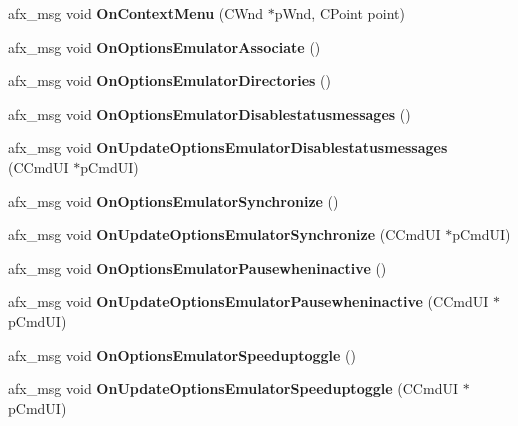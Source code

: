 \begin{DoxyCompactItemize}
afx\+\_\+msg void {\bfseries On\+Context\+Menu} (C\+Wnd $\ast$p\+Wnd, C\+Point point)
\item 
\mbox{\label{class_main_wnd_a824b678e28dacab4a43b4ac0918e8555}} 
afx\+\_\+msg void {\bfseries On\+Options\+Emulator\+Associate} ()
\item 
\mbox{\label{class_main_wnd_a5d36b0308cca73a7aa4af8df269a743c}} 
afx\+\_\+msg void {\bfseries On\+Options\+Emulator\+Directories} ()
\item 
\mbox{\label{class_main_wnd_adaf6a97c2076cf3b509e5847f57c223d}} 
afx\+\_\+msg void {\bfseries On\+Options\+Emulator\+Disablestatusmessages} ()
\item 
\mbox{\label{class_main_wnd_a21587f86709a0f12079e3eb7b51c60dd}} 
afx\+\_\+msg void {\bfseries On\+Update\+Options\+Emulator\+Disablestatusmessages} (C\+Cmd\+UI $\ast$p\+Cmd\+UI)
\item 
\mbox{\label{class_main_wnd_a7c06835a2c41f9999bd1ac57573b1ca5}} 
afx\+\_\+msg void {\bfseries On\+Options\+Emulator\+Synchronize} ()
\item 
\mbox{\label{class_main_wnd_a8a7e869df1655fe77cb450db712fd9a9}} 
afx\+\_\+msg void {\bfseries On\+Update\+Options\+Emulator\+Synchronize} (C\+Cmd\+UI $\ast$p\+Cmd\+UI)
\item 
\mbox{\label{class_main_wnd_a0def4f8d03a9034f1644571a029cd062}} 
afx\+\_\+msg void {\bfseries On\+Options\+Emulator\+Pausewheninactive} ()
\item 
\mbox{\label{class_main_wnd_a10dd32a50e583f5ddb0d2af4ecfd0440}} 
afx\+\_\+msg void {\bfseries On\+Update\+Options\+Emulator\+Pausewheninactive} (C\+Cmd\+UI $\ast$p\+Cmd\+UI)
\item 
\mbox{\label{class_main_wnd_a3c88d3d358d76bb7ef362fa7c4b1be4b}} 
afx\+\_\+msg void {\bfseries On\+Options\+Emulator\+Speeduptoggle} ()
\item 
\mbox{\label{class_main_wnd_af19332119096c90e31ee0c2f49ec8359}} 
afx\+\_\+msg void {\bfseries On\+Update\+Options\+Emulator\+Speeduptoggle} (C\+Cmd\+UI $\ast$p\+Cmd\+UI)

\end{DoxyCompactItemize}
